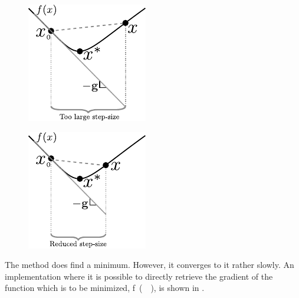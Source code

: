 %
\begin{minipage}{\linewidth}
	\begin{minipage}{0.45\linewidth}
		\begin{figure}[H]
			\includegraphics[scale=1.4]{figures/gradientDescendLargeStep2}
			\centering
			\captionsetup{justification=centering}
			\label{SteepestDescendLargeStep}
		\end{figure}
	\end{minipage}
	\hspace{0.03\linewidth}
	\begin{minipage}{0.45\linewidth}
		\begin{figure}[H]
			\includegraphics[scale=1.44]{figures/gradientDescendReducedStep2}
			\centering
			\captionsetup{justification=centering}
			\label{SteepestDescendSmallStep}
		\end{figure}
	\end{minipage}
\end{minipage}

The method does find a minimum. However, it converges to it rather slowly. An implementation where it is possible to directly retrieve the gradient of the function which is to be minimized, \si{f()}, is shown in .


